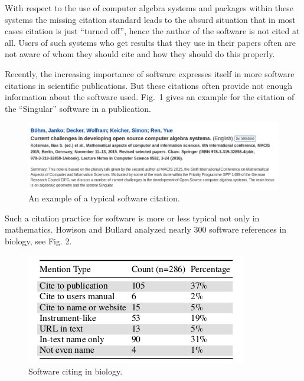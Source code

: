 \documentclass[12pt]{article}
\begin{document}
With respect to the use of computer algebra systems and packages within these
systems the missing citation standard leads to the absurd situation that in
most cases citation is just ``turned off'', hence the author of the software is
not cited at all. Users of such systems who get results that they use in their
papers often are not aware of whom they should cite and how they should do this
properly.

Recently, the increasing importance of software expresses itself in more
software citations in scientific publications. But these citations often
provide not enough information about the software used.  Fig.~1 gives an
example for the citation of the ``Singular'' software in a publication.

\begin{figure}[ht]
 \centering
 \includegraphics[width=.7\textwidth]{aca1}
 \caption{An example of a typical software citation.\label{abb_1}}
\end{figure}

Such a citation practice for software is more or less typical not only in
mathematics. Howison and Bullard \cite{Howison&Bullard2015} analyzed nearly 300
software references in biology, see Fig. 2.

\begin{figure}[ht]
 \centering
 \includegraphics[width=.7\textwidth]{aca2}
 \caption{Software citing in biology.\label{abb_2}}
\end{figure}
\end{document}
